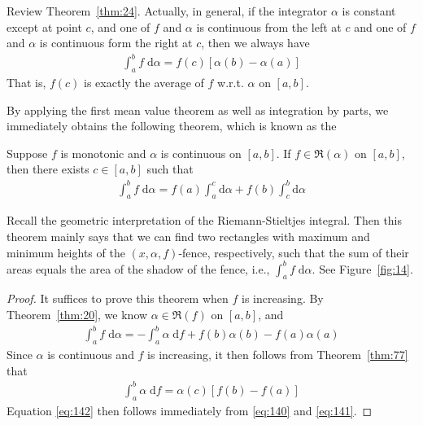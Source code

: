 \documentclass[thmcnt=section, 12pt]{my-elegantbook}
\begin{document}
Review Theorem~\ref{thm:24}.
Actually, in general, if the integrator $\alpha$
is constant except at point $c$,
and one of $f$ and $\alpha$ is continuous from the left at $c$
and one of $f$ and $\alpha$ is continuous form the right at $c$,
then we always have
\begin{align*}
    \int_a^b f \; \mathrm{d} \alpha
    = f(c) [\alpha(b) - \alpha(a)]
\end{align*}
That is, $f(c)$ is exactly the average of $f$ w.r.t. $\alpha$ on $[a, b]$.


By applying the first mean value theorem
as well as integration by parts,
we immediately obtains the following theorem,
which is known as
the 

\begin{theorem} \label{thm:78}
    Suppose $f$ is monotonic and $\alpha$ is continuous on $[a, b]$.
    If $f \in \mathfrak{R}(\alpha)$ on $[a, b]$,
    then there exists $c \in [a, b]$ such that
    \begin{align}
        \int_a^b f \; \mathrm{d}\alpha
        = f(a) \int_a^c \mathrm{d} \alpha
        + f(b) \int_c^b \mathrm{d} \alpha
        \label{eq:142}
    \end{align}
\end{theorem}

Recall the geometric interpretation of the
Riemann-Stieltjes integral.
Then this theorem mainly says that
we can find two rectangles
with maximum and minimum heights of the $(x,\alpha,f)$-fence,
respectively,
such that the sum of their areas
equals the area of the shadow of the fence, i.e.,
$\int_a^b f \; \mathrm{d} \alpha$.
See Figure~\ref{fig:14}.

\begin{proof}
    It suffices to prove this theorem when $f$ is increasing.
    By Theorem~\ref{thm:20}, we know $\alpha \in \mathfrak{R}(f)$
    on $[a, b]$, and
    \begin{align}
        \int_a^b f \; \mathrm{d} \alpha
        = -\int_a^b \alpha \; \mathrm{d} f
        + f(b) \alpha(b) - f(a) \alpha(a)
        \label{eq:140}
    \end{align}
    Since $\alpha$ is continuous and $f$ is increasing,
    it then follows from Theorem~\ref{thm:77} that
    \begin{align}
        \int_a^b \alpha \; \mathrm{d} f
        = \alpha(c) [f(b) - f(a)]
        \label{eq:141}
    \end{align}
    Equation \eqref{eq:142} then follows immediately from \eqref{eq:140}
    and \eqref{eq:141}.
\end{proof}
\end{document}
